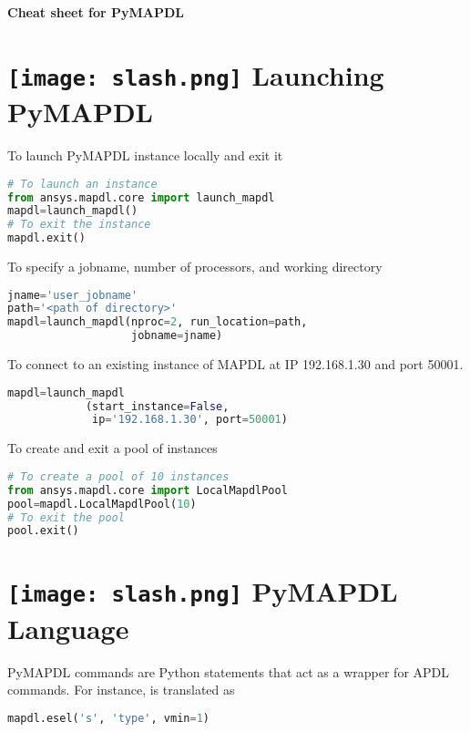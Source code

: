 \documentclass[9pt,landscape]{article}
\begin{document}
\raggedright
\footnotesize
\begin{center}
     \Huge{\textbf{Cheat sheet for PyMAPDL}} \\
\end{center}
\vspace{-0.15cm}
\noindent\makebox[\linewidth]{\rule{\paperwidth}{2pt}}

\begin{multicols}{3}
\setlength{\premulticols}{1pt}
\setlength{\postmulticols}{1pt}
\setlength{\multicolsep}{1pt}
\setlength{\columnsep}{2pt}

\section{\texttt{[image: slash.png]} Launching PyMAPDL}
To launch PyMAPDL instance locally and exit it
\begin{lstlisting}[language=Python]
# To launch an instance
from ansys.mapdl.core import launch_mapdl
mapdl=launch_mapdl()
# To exit the instance
mapdl.exit()
\end{lstlisting}

To specify a jobname, number of processors, and working directory
\begin{lstlisting}[language=Python]
jname='user_jobname'
path='<path of directory>'
mapdl=launch_mapdl(nproc=2, run_location=path,
                   jobname=jname)
\end{lstlisting}

To connect to an existing instance of MAPDL at IP 192.168.1.30 and port 50001.
\begin{lstlisting}[language=Python]
mapdl=launch_mapdl
            (start_instance=False,
             ip='192.168.1.30', port=50001)
\end{lstlisting}
To create and exit a pool of instances
\begin{lstlisting}[language=Python]
# To create a pool of 10 instances
from ansys.mapdl.core import LocalMapdlPool
pool=mapdl.LocalMapdlPool(10)
# To exit the pool
pool.exit()
\end{lstlisting}

\section{\texttt{[image: slash.png]} PyMAPDL Language}
PyMAPDL commands are Python statements that act as a wrapper for APDL commands. For instance,  is translated as
\begin{lstlisting}[language=Python]
mapdl.esel('s', 'type', vmin=1) 
\end{lstlisting}


\end{multicols}
\end{document}
